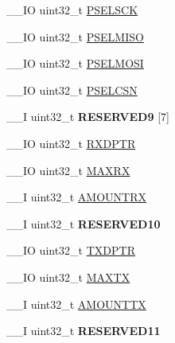 \begin{DoxyCompactItemize}
\item 
\+\_\+\+\_\+\+I\+O uint32\+\_\+t \hyperlink{struct_n_r_f___s_p_i_s___type_a49bfa5b0e3fc7d3df00ddb04b3314561}{P\+S\+E\+L\+S\+C\+K}
\item 
\+\_\+\+\_\+\+I\+O uint32\+\_\+t \hyperlink{struct_n_r_f___s_p_i_s___type_a05878f24ed65b9b813209068c60e8eff}{P\+S\+E\+L\+M\+I\+S\+O}
\item 
\+\_\+\+\_\+\+I\+O uint32\+\_\+t \hyperlink{struct_n_r_f___s_p_i_s___type_a37cefee7d37874a9a0de572844d564c4}{P\+S\+E\+L\+M\+O\+S\+I}
\item 
\+\_\+\+\_\+\+I\+O uint32\+\_\+t \hyperlink{struct_n_r_f___s_p_i_s___type_af0a87e8d39a0cbb664bf93fa9a0adf10}{P\+S\+E\+L\+C\+S\+N}
\item 
\hypertarget{struct_n_r_f___s_p_i_s___type_ae66c32ff4b085b46e39b76cc87c4dc84}{}\+\_\+\+\_\+\+I uint32\+\_\+t {\bfseries R\+E\+S\+E\+R\+V\+E\+D9} \mbox{[}7\mbox{]}\label{struct_n_r_f___s_p_i_s___type_ae66c32ff4b085b46e39b76cc87c4dc84}

\item 
\+\_\+\+\_\+\+I\+O uint32\+\_\+t \hyperlink{struct_n_r_f___s_p_i_s___type_a619edc9b0068122f3a70ee4ec263d9d7}{R\+X\+D\+P\+T\+R}
\item 
\+\_\+\+\_\+\+I\+O uint32\+\_\+t \hyperlink{struct_n_r_f___s_p_i_s___type_ac25380aef8acb0d3c753fd58a3c19578}{M\+A\+X\+R\+X}
\item 
\+\_\+\+\_\+\+I uint32\+\_\+t \hyperlink{struct_n_r_f___s_p_i_s___type_ac14965c1685a4fe6d5967cf307947a2a}{A\+M\+O\+U\+N\+T\+R\+X}
\item 
\hypertarget{struct_n_r_f___s_p_i_s___type_a125644f338099bdd6e1da12327a924c4}{}\+\_\+\+\_\+\+I uint32\+\_\+t {\bfseries R\+E\+S\+E\+R\+V\+E\+D10}\label{struct_n_r_f___s_p_i_s___type_a125644f338099bdd6e1da12327a924c4}

\item 
\+\_\+\+\_\+\+I\+O uint32\+\_\+t \hyperlink{struct_n_r_f___s_p_i_s___type_a350802ea1da8fbdb8ffb95f4ad8aba4d}{T\+X\+D\+P\+T\+R}
\item 
\+\_\+\+\_\+\+I\+O uint32\+\_\+t \hyperlink{struct_n_r_f___s_p_i_s___type_a6ecfd5f949e468fcdf914f2fa48b64bc}{M\+A\+X\+T\+X}
\item 
\+\_\+\+\_\+\+I uint32\+\_\+t \hyperlink{struct_n_r_f___s_p_i_s___type_a7ea61f6a50faa8df40de5a141b684c02}{A\+M\+O\+U\+N\+T\+T\+X}
\item 
\hypertarget{struct_n_r_f___s_p_i_s___type_a8e521b555a9e78523c3728032c110579}{}\+\_\+\+\_\+\+I uint32\+\_\+t {\bfseries R\+E\+S\+E\+R\+V\+E\+D11}\label{struct_n_r_f___s_p_i_s___type_a8e521b555a9e78523c3728032c110579}


\end{DoxyCompactItemize}
